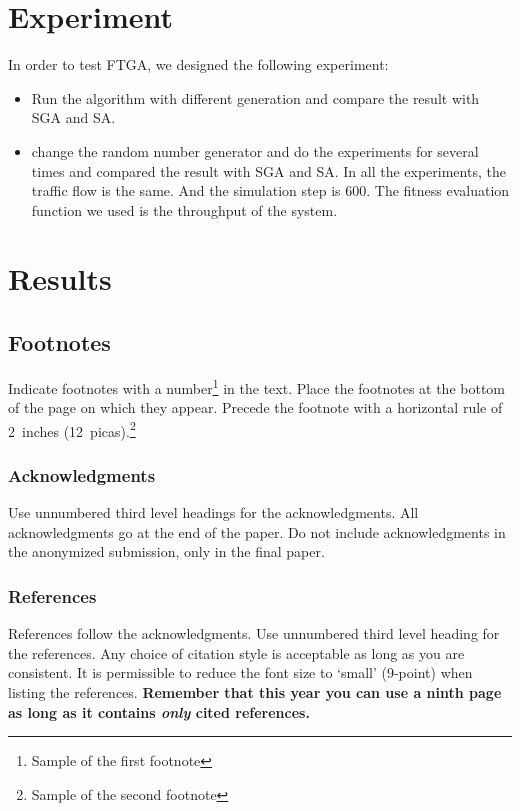 \documentclass{article} %
\begin{document}
\section{Experiment}
In order to test FTGA, we designed the following experiment:
\begin{itemize}
	\item Run the algorithm with different generation and compare the result with SGA and SA.
	\item change the random number generator and do the experiments for several times and compared the result with SGA and SA.
	In all the experiments, the traffic flow is the same. And the simulation step is 600. The fitness evaluation function we used is the throughput of the system.
	
\end{itemize}


\section{Results}


\subsection{Footnotes}

Indicate footnotes with a number\footnote{Sample of the first footnote} in the
text. Place the footnotes at the bottom of the page on which they appear.
Precede the footnote with a horizontal rule of 2~inches
(12~picas).\footnote{Sample of the second footnote}

\subsubsection*{Acknowledgments}

Use unnumbered third level headings for the acknowledgments. All
acknowledgments go at the end of the paper. Do not include 
acknowledgments in the anonymized submission, only in the 
final paper. 

\subsubsection*{References}

References follow the acknowledgments. Use unnumbered third level heading for
the references. Any choice of citation style is acceptable as long as you are
consistent. It is permissible to reduce the font size to `small' (9-point) 
when listing the references. {\bf Remember that this year you can use
a ninth page as long as it contains \emph{only} cited references.}
\end{document}
